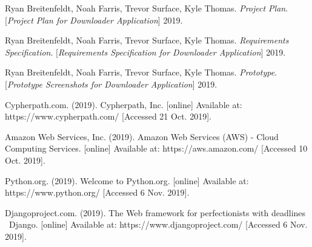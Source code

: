 \documentclass{article}
\begin{document}



%
%










\newpage
{}
    \begin{thebibliography}{7}
    Ryan Breitenfeldt, Noah Farris, Trevor Surface, Kyle Thomas.
    \textit{Project Plan}.
    [\textit{Project Plan for Downloader Application}] 2019.

    Ryan Breitenfeldt, Noah Farris, Trevor Surface, Kyle Thomas.
    \textit{Requirements Specification}.
    [\textit{Requirements Specification for Downloader Application}] 2019.

    Ryan Breitenfeldt, Noah Farris, Trevor Surface, Kyle Thomas.
    \textit{Prototype}.
    [\textit{Prototype Screenshots for Downloader Application}] 2019.


    Cypherpath.com. (2019). Cypherpath, Inc. [online] Available at: https://www.cypherpath.com/ [Accessed 21 Oct. 2019].

    Amazon Web Services, Inc. (2019). Amazon Web Services (AWS) - Cloud Computing Services. [online] Available at: https://aws.amazon.com/ [Accessed 10 Oct. 2019].


    Python.org. (2019). Welcome to Python.org. [online] Available at: https://www.python.org/ [Accessed 6 Nov. 2019].

    Djangoproject.com. (2019). The Web framework for perfectionists with deadlines \textbar\ Django. [online] Available at: https://www.djangoproject.com/ [Accessed 6 Nov. 2019].
    \end{thebibliography}

\end{document}

